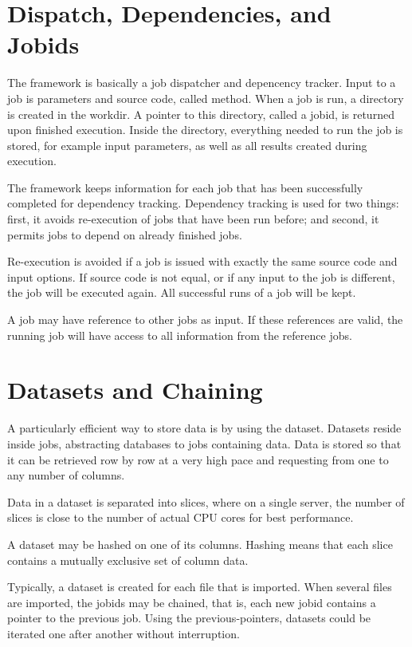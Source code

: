 \section{Dispatch, Dependencies, and Jobids}

The framework is basically a job dispatcher and depencency tracker.
Input to a job is parameters and source code, called method.  When a
job is run, a directory is created in the workdir.  A pointer to this
directory, called a jobid, is returned upon finished execution.
Inside the directory, everything needed to run the job is stored, for
example input parameters, as well as all results created during
execution.

The framework keeps information for each job that has been
successfully completed for dependency tracking.  Dependency tracking
is used for two things: first, it avoids re-execution of jobs that
have been run before; and second, it permits jobs to depend on already
finished jobs.

Re-execution is avoided if a job is issued with exactly the same
source code and input options.  If source code is not equal, or if any
input to the job is different, the job will be executed again.  All
successful runs of a job will be kept.

A job may have reference to other jobs as input.  If these references
are valid, the running job will have access to all information from
the reference jobs.



\section{Datasets and Chaining}

A particularly efficient way to store data is by using the dataset.
Datasets reside inside jobs, abstracting databases to jobs containing
data.  Data is stored so that it can be retrieved row by row at a very
high pace and requesting from one to any number of columns.

Data in a dataset is separated into slices, where on a single server,
the number of slices is close to the number of actual CPU cores for
best performance.

A dataset may be hashed on one of its columns.  Hashing means that
each slice contains a mutually exclusive set of column data.

Typically, a dataset is created for each file that is imported.  When
several files are imported, the jobids may be chained, that is, each
new jobid contains a pointer to the previous job.  Using the
previous-pointers, datasets could be iterated one after another
without interruption.



